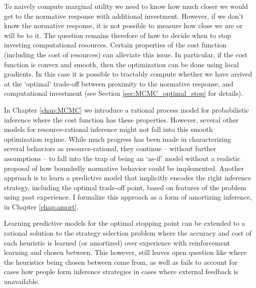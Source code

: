 To naively compute marginal utility we need to know how much closer we would get to the normative response with additional investment. However, if we don't know the normative response, it is not possible to measure how close we are or will be to it. The question remains therefore of how to decide when to stop investing computational resources. Certain properties of the cost function (including the cost of resources) can alleviate this issue. In particular, if the cost function is convex and smooth, then the optimization can be done using local gradients. In this case it is possible to tractably compute whether we have arrived at the `optimal' trade-off between proximity to the normative response, and computational investment (see Section \ref{sec:MCMC_optimal_stop} for details).


In Chapter \ref{chap:MCMC} we introduce a rational process model for probabilistic inference where the cost function has these properties. However, several other models for resource-rational inference might not fall into this smooth optimization regime. \citep{horvitz1989reflection, russell1994provably, hay2014selecting} While much progress has been made in characterizing several behaviors as resource-rational, they continue -- without further assumptions -- to fall into the trap of being an `as-if' model without a realistic proposal of how boundedly normative behavior could be implemented. Another approach is to learn a predictive model that implicitly encodes the right inference strategy, including the optimal trade-off point, based on features of the problem using past experience. I formalize this approach as a form of amortizing inference, in Chapter \ref{chap:amort}. 

Learning predictive models for the optimal stopping point can be extended to a rational solution to the strategy selection problem\citep{lieder2017strategy} where the accuracy and cost of each heuristic is learned (or amortized) over experience with reinforcement learning and chosen between. \citep{erev05, rieskamp06} This however, still leaves open question like where the heuristics being chosen between come from, as well as fails to account for cases how people form inference strategies in cases where external feedback is unavailable.


